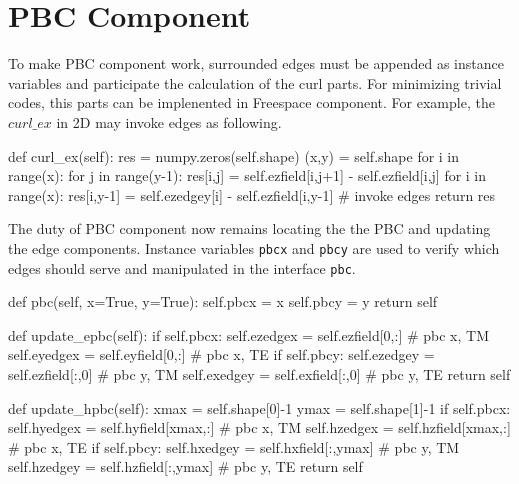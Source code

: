 \section{PBC Component}
To make PBC component work, surrounded edges must be appended as instance variables and participate the calculation of
the curl parts. For minimizing trivial codes, this parts can be implenented in Freespace component. For example, the
$curl\_ex$ in 2D may invoke edges as following.
\begin{code}
    def curl_ex(self):
        res = numpy.zeros(self.shape)
        (x,y) = self.shape
        for i in range(x):
            for j in range(y-1):
                res[i,j] = self.ezfield[i,j+1] - self.ezfield[i,j]
        for i in range(x):
            res[i,y-1] = self.ezedgey[i] - self.ezfield[i,y-1]  # invoke edges
        return res
\end{code}
The duty of PBC component now remains locating the the PBC and updating the edge components. Instance variables
\texttt{pbcx} and \texttt{pbcy} are used to verify which edges should serve and manipulated in the interface
\texttt{pbc}.
\begin{code}
    def pbc(self, x=True, y=True):
        self.pbcx = x
        self.pbcy = y
        return self

    def update_epbc(self):
        if self.pbcx:
            self.ezedgex = self.ezfield[0,:] # pbc x, TM
            self.eyedgex = self.eyfield[0,:] # pbc x, TE
        if self.pbcy:
            self.ezedgey = self.ezfield[:,0] # pbc y, TM
            self.exedgey = self.exfield[:,0] # pbc y, TE
        return self

    def update_hpbc(self):
        xmax = self.shape[0]-1
        ymax = self.shape[1]-1
        if self.pbcx:
            self.hyedgex = self.hyfield[xmax,:] # pbc x, TM
            self.hzedgex = self.hzfield[xmax,:] # pbc x, TE
        if self.pbcy:
            self.hxedgey = self.hxfield[:,ymax] # pbc y, TM
            self.hzedgey = self.hzfield[:,ymax] # pbc y, TE
        return self
\end{code}

